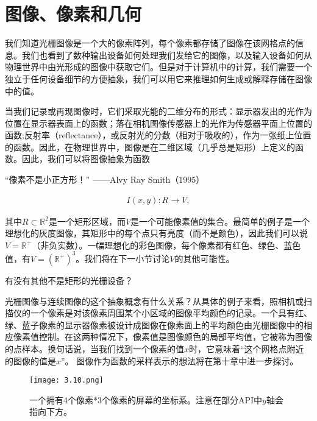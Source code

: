 \documentclass[lang=cn,12pt]{elegantbook}
\begin{document}
\section{图像、像素和几何}

我们知道光栅图像是一个大的像素阵列，每个像素都存储了图像在该网格点的信息。我们也看到了数种输出设备如何处理我们发给它的图像，以及输入设备如何从物理世界中由光形成的图像中获取它们。但是对于计算机中的计算，我们需要一个独立于任何设备细节的方便抽象，我们可以用它来推理如何生成或解释存储在图像中的值。

当我们记录或再现图像时，它们采取光能的二维分布的形式：显示器发出的光作为位置在显示器表面上的函数；落在相机图像传感器上的光作为传感器平面上位置的函数;反射率（reflectance），或反射光的分数（相对于吸收的），作为一张纸上位置的函数。因此，在物理世界中，图像是在二维区域（几乎总是矩形）上定义的函数。因此，我们可以将图像抽象为函数

\begin{note}
  “像素不是小正方形！”  ——Alvy Ray Smith（1995）
\end{note}


\[
  \begin{aligned}
    I(x,y):R\rightarrow V,
  \end{aligned}
\]

其中$R\subset \mathbb{R} ^2$是一个矩形区域，而$V$是一个可能像素值的集合。最简单的例子是一个理想化的灰度图像，其矩形中的每个点只有亮度（而不是颜色），因此我们可以说$V=\mathbb{R}^{+}$（非负实数）。一幅理想化的彩色图像，每个像素都有红色、绿色、蓝色值，有$V=(\mathbb{R}^{+})^3$。我们将在下一小节讨论$V$的其他可能性。

\begin{note}
  有没有其他不是矩形的光栅设备？
\end{note}

光栅图像与连续图像的这个抽象概念有什么关系？从具体的例子来看，照相机或扫描仪的一个像素是对该像素周围某个小区域的图像平均颜色的记录。一个具有红、绿、蓝子像素的显示器像素被设计成图像在像素面上的平均颜色由光栅图像中的相应像素值控制。在这两种情况下，像素值是图像颜色的局部平均值，它被称为图像的点样本。换句话说，当我们找到一个像素的值$x$时，它意味着“这个网格点附近的图像的值是$x$”。 图像作为函数的采样表示的想法将在第十章中进一步探讨。

\begin{figure}[htb]
  \centering
  \texttt{[image: 3.10.png]}
  \caption{一个拥有4个像素*3个像素的屏幕的坐标系。注意在部分API中$y$轴会指向下方。}
\end{figure}
\end{document}
